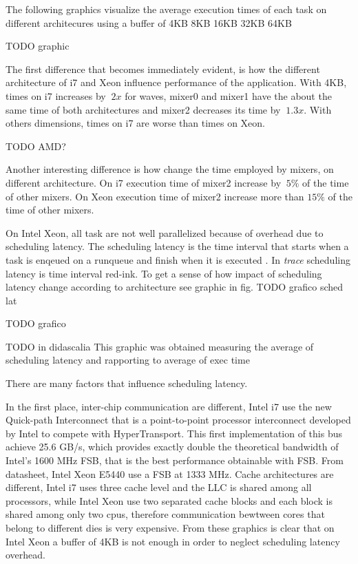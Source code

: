 \newpage

The following graphics visualize the average execution times of each task on different architecures using a buffer of 4KB 8KB 16KB 32KB 64KB

TODO graphic

The first difference that becomes immediately evident, is how the different architecture of i7 and Xeon influence performance of the application.
With 4KB, times on i7 increases by $~ 2x$ for waves, mixer0 and mixer1 have the about the same time of both architectures and mixer2 decreases its time by 
$~ 1.3x$. With others dimensions, times on i7 are worse than times on Xeon.

TODO AMD?

Another interesting difference is how change the time employed by mixers, on different architecture. On i7 execution time of mixer2 increase by $~ 5\%$ 
of the time of other mixers. On Xeon execution time of mixer2 increase more than $15\%$ of the time of other mixers.

On Intel Xeon, all task are not well parallelized because of overhead due to scheduling latency. The scheduling latency is the time interval that starts when
a task is enqeued on a runqueue and finish when it is executed \cite{lcs}. In \textit{trace} scheduling latency is time interval red-ink. To get a sense 
of how impact of scheduling latency change according to architecture see graphic in fig. TODO grafico sched lat

TODO grafico

TODO in didascalia This graphic was obtained measuring the average of scheduling latency and rapporting to average of exec time

There are many factors that influence scheduling latency. 


In the first place, inter-chip communication are different, Intel i7 use the new Quick-path 
Interconnect that is a point-to-point processor interconnect developed by Intel to compete with HyperTransport. This first implementation of this bus
achieve 25.6 GB/s, which provides exactly double the theoretical bandwidth of Intel's 1600 MHz FSB, that is the best performance obtainable with FSB.
From datasheet, Intel Xeon E5440 use a FSB at 1333 MHz. Cache architectures are different, Intel i7 uses three cache level and the LLC is shared among all 
processors, while Intel Xeon use two separated cache blocks and each block is shared among only two cpus, therefore communication bewtween cores that belong 
to different dies is very expensive. From these graphics is clear that on Intel Xeon a buffer of 4KB is not enough in order to neglect scheduling latency 
overhead.

